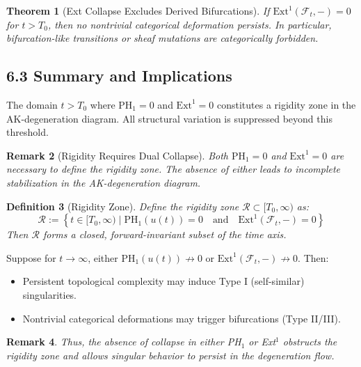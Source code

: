 \documentclass[11pt]{article}
\newtheorem{theorem}{Theorem}[section]
\newtheorem{definition}[theorem]{Definition}
\newtheorem{remark}[theorem]{Remark}
\begin{document}
\begin{theorem}[Ext Collapse Excludes Derived Bifurcations]
If $\mathrm{Ext}^1(\mathcal{F}_t, -) = 0$ for $t > T_0$, then no nontrivial categorical deformation persists. In particular, bifurcation-like transitions or sheaf mutations are categorically forbidden.
\end{theorem}

\subsection{6.3 Summary and Implications}

\begin{corollary}
The domain $t > T_0$ where $\mathrm{PH}_1 = 0$ and $\mathrm{Ext}^1 = 0$ constitutes a rigidity zone in the AK-degeneration diagram. All structural variation is suppressed beyond this threshold.
\end{corollary}

\begin{remark}[Rigidity Requires Dual Collapse]
Both $\mathrm{PH}_1 = 0$ and $\mathrm{Ext}^1 = 0$ are necessary to define the rigidity zone. The absence of either leads to incomplete stabilization in the AK-degeneration diagram.
\end{remark}

\begin{definition}[Rigidity Zone]
Define the rigidity zone $\mathcal{R} \subset [T_0, \infty)$ as:
\[
\mathcal{R} := \left\{ t \in [T_0, \infty) \mid \mathrm{PH}_1(u(t)) = 0 \quad \text{and} \quad \mathrm{Ext}^1(\mathcal{F}_t, -) = 0 \right\}
\]
Then $\mathcal{R}$ forms a closed, forward-invariant subset of the time axis.
\end{definition}

\begin{proposition}
Suppose for $t \to \infty$, either $\mathrm{PH}_1(u(t)) \not\to 0$ or $\mathrm{Ext}^1(\mathcal{F}_t, -) \not\to 0$. Then:

\begin{itemize}
    \item Persistent topological complexity may induce Type I (self-similar) singularities.
    \item Nontrivial categorical deformations may trigger bifurcations (Type II/III).
\end{itemize}
\end{proposition}

\begin{remark}
Thus, the absence of collapse in either PH$_1$ or Ext$^1$ obstructs the rigidity zone and allows singular behavior to persist in the degeneration flow.
\end{remark}
\end{document}
